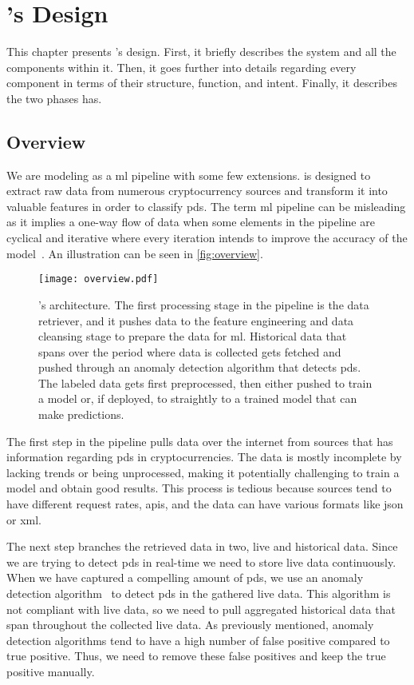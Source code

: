\chapter{\project's Design}\label{ch:design}\glsresetall
This chapter presents \project's design. First, it briefly describes the system and all the components within it. Then, it goes further into details regarding every component in terms of their structure, function, and intent. Finally, it describes the two phases \project has.

\section{Overview}
We are modeling \project as a \ac{ml} pipeline with some few extensions. \project is designed to extract raw data from numerous cryptocurrency sources and transform it into valuable features in order to classify \acp{pd}. The term \ac{ml} pipeline can be misleading as it implies a one-way flow of data when some elements in the pipeline are cyclical and iterative where every iteration intends to improve the accuracy of the model~\cite{ml_pipeline_3}. An illustration can be seen in \autoref{fig:overview}.

\begin{figure}[ht]
    \centering
    \texttt{[image: overview.pdf]}
    \caption[\project's architecture]{\project's architecture. The first processing stage in the pipeline is the data retriever, and it pushes data to the feature engineering and data cleansing stage to prepare the data for \ac{ml}. Historical data that spans over the period where data is collected gets fetched and pushed through an anomaly detection algorithm that detects \acp{pd}. The labeled data gets first preprocessed, then either pushed to train a model or, if deployed, to straightly to a trained model that can make predictions.}
    \label{fig:overview}
\end{figure}

The first step in the pipeline pulls data over the internet from sources that has information regarding \acp{pd} in cryptocurrencies. The data is mostly incomplete by lacking trends or being unprocessed, making it potentially challenging to train a model and obtain good results. This process is tedious because sources tend to have different request rates, \acp{api}, and the data can have various formats like \ac{json} or \ac{xml}.

The next step branches the retrieved data in two, live and historical data. Since we are trying to detect \acp{pd} in real-time we need to store live data continuously. When we have captured a compelling amount of \acp{pd}, we use an anomaly detection algorithm~\cite{P&D_to_the_moon} to detect \acp{pd} in the gathered live data. This algorithm is not compliant with live data, so we need to pull aggregated historical data that span throughout the collected live data. As previously mentioned, anomaly detection algorithms tend to have a high number of false positive compared to true positive. Thus, we need to remove these false positives and keep the true positive manually.


